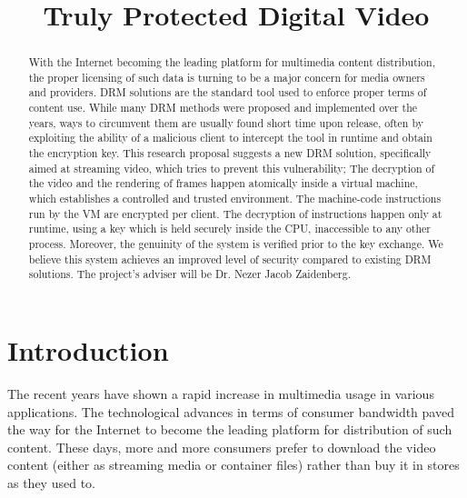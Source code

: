 \documentclass[conference]{IEEEtran}
\begin{document}
\title{Truly Protected Digital Video}
\author{
}
\maketitle

\begin{abstract} 

With the Internet becoming the leading platform for multimedia content
distribution, the proper licensing of such data is turning to be a major
concern for media owners and providers. DRM solutions are the standard tool used
to enforce proper terms of content use. While many DRM methods were proposed
and implemented over the years, ways to circumvent them are usually
found short time upon release, often by exploiting the ability of a
malicious client to intercept the tool in runtime and obtain the
encryption key. This research proposal suggests a new DRM solution,
specifically aimed at streaming video, which tries to prevent this
vulnerability; The decryption of the video and the rendering of frames
happen atomically inside a virtual machine, which establishes a controlled
and trusted environment. The machine-code instructions run by the VM
are encrypted per client. The decryption of instructions happen only at
runtime, using a key which is held securely inside the CPU, inaccessible
to any other process. Moreover, the genuinity of the system is verified
prior to the key exchange. We believe this system achieves an improved
level of security compared to existing DRM solutions. The project's
adviser will be Dr. Nezer Jacob Zaidenberg.

\end{abstract} 
\IEEEpeerreviewmaketitle

\section{Introduction} 

The recent years have shown a rapid increase in multimedia usage in
various applications. The technological advances in terms of consumer
bandwidth paved the way for the Internet to become the leading platform
for distribution of such content. These days, more and more consumers
prefer to download the video content (either as streaming media or
container files) rather than buy it in stores as they used to.
\end{document}
